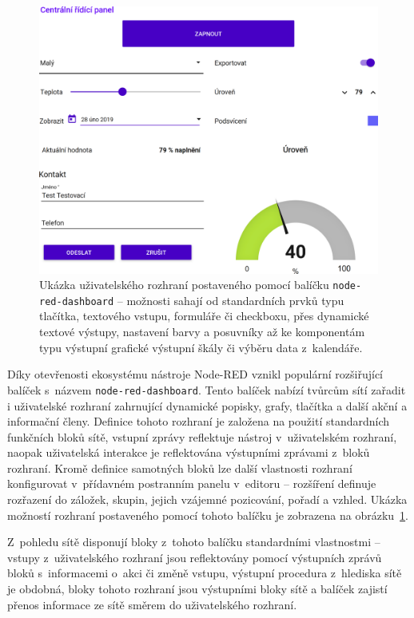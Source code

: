 \begin{figure}[th]
    \centering
    \includegraphics[width=\textwidth]{figures/node-red-dashboard.png}
    \caption{Ukázka uživatelského rozhraní postaveného pomocí balíčku \texttt{node-red-dashboard} -- možnosti sahají
    od standardních prvků typu tlačítka, textového vstupu, formuláře či checkboxu, přes dynamické textové výstupy,
    nastavení barvy a posuvníky až ke komponentám typu výstupní grafické výstupní škály či výběru data z~kalendáře.}
    \label{fig:node-red-dashboard}
\end{figure}

Díky otevřenosti ekosystému nástroje Node-RED vznikl populární rozšiřující balíček s~názvem
\texttt{node-red-dashboard}.
Tento balíček nabízí tvůrcům sítí zařadit i uživatelské rozhraní zahrnující dynamické
popisky, grafy, tlačítka a další akční a informační členy.
Definice tohoto rozhraní je založena na použití standardních funkčních bloků sítě, vstupní zprávy reflektuje nástroj
v~uživatelském rozhraní, naopak uživatelská interakce je reflektována výstupními zprávami z~bloků rozhraní.
Kromě definice samotných bloků lze další vlastnosti rozhraní konfigurovat v~přídavném postranním panelu v~editoru --
rozšíření definuje rozřazení do záložek, skupin, jejich vzájemné pozicování, pořadí a vzhled.
Ukázka možností rozhraní postaveného pomocí tohoto balíčku je zobrazena na obrázku~\ref{fig:node-red-dashboard}.

Z~pohledu sítě disponují bloky z~tohoto balíčku standardními vlastnostmi -- vstupy z~uživatelského rozhraní jsou
reflektovány pomocí výstupních zprávů bloků s~informacemi o~akci či změně vstupu, výstupní procedura z~hlediska sítě
je obdobná, bloky tohoto rozhraní jsou výstupními bloky sítě a balíček zajistí přenos informace ze sítě směrem do
uživatelského rozhraní.

